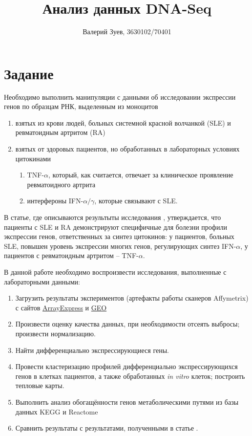 \documentclass{article}
\begin{document}
\title{Анализ данных DNA-Seq}
\author{Валерий Зуев, 3630102/70401}
\maketitle

\section{Задание}

Необходимо выполнить манипуляции с данными об исследовании экспрессии генов по образцам РНК, выделенным из моноцитов
\begin{enumerate}
    \item взятых из крови людей, больных системной красной волчанкой (SLE) и ревматоидным артритом (RA)
    \item взятых от здоровых пациентов, но обработанных в лабораторных условиях цитокинами
    \begin{enumerate}
        \item TNF-$\alpha$, который, как считается, отвечает за клиническое проявление ревматоидного артрита
        \item интерфероны IFN-$\alpha/\gamma$, которые связывают с SLE.
    \end{enumerate}
\end{enumerate}

В статье, где описываются результыты исследования \cite{smiljanovich2012}, утверждается, что пациенты с SLE и RA демонстрируют специфичные для болезни профили экспрессии генов, ответственных за синтез цитокинов: у пациентов, больных SLE, повышен уровень экспрессии многих генов, регулирующих синтез IFN-$\alpha$, у пациентов с ревматоидным артритом -- TNF-$\alpha$.

В данной работе необходимо воспроизвести исследования, выполненные с лабораторными данными:

\begin{enumerate}
    \item Загрузить результаты экспериментов (артефакты работы сканеров Affymetrix) с сайтов \href{https://www.ebi.ac.uk/arrayexpress/experiments/E-GEOD-38351/}{ArrayExpress} и \href{https://www.ncbi.nlm.nih.gov/geo/download/?acc=GSE38351}{GEO}
    \item Произвести оценку качества данных, при необходимости отсеять выбросы; произвести нормализацию.
    \item Найти дифференциально экспрессирующиеся гены.
    \item Провести кластеризацию профилей дифференциально экспрессирующихся генов в клетках пациентов, а также обработанных \textit{in vitro} клеток; построить тепловые карты.
    \item Выполнить анализ обогащённости генов метаболическими путями из базы данных KEGG и Reactome
    \item Сравнить результаты с результатами, полученными в статье \cite{smiljanovich2012}.
\end{enumerate}
\end{document}
